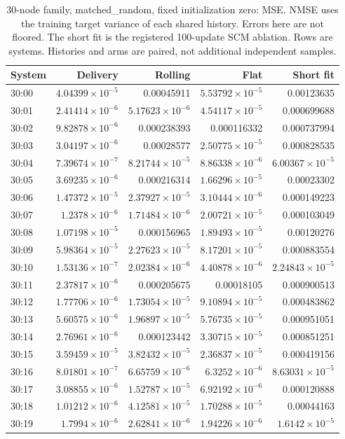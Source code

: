 \begin{table}[ht]
\centering\scriptsize
\begin{tabular}{lrrrr}
\toprule
System & Delivery & Rolling & Flat & Short fit\\
\midrule
30:00 & $4.04399\times10^{-5}$ & 0.00045911 & $5.53792\times10^{-5}$ & 0.00123635\\
30:01 & $2.41414\times10^{-6}$ & $5.17623\times10^{-6}$ & $4.54117\times10^{-5}$ & 0.000699688\\
30:02 & $9.82878\times10^{-6}$ & 0.000238393 & 0.000116332 & 0.000737994\\
30:03 & $3.04197\times10^{-6}$ & 0.00028577 & $2.50775\times10^{-5}$ & 0.000828535\\
30:04 & $7.39674\times10^{-7}$ & $8.21744\times10^{-5}$ & $8.86338\times10^{-6}$ & $6.00367\times10^{-5}$\\
30:05 & $3.69235\times10^{-6}$ & 0.000216314 & $1.66296\times10^{-5}$ & 0.00023302\\
30:06 & $1.47372\times10^{-5}$ & $2.37927\times10^{-5}$ & $3.10444\times10^{-6}$ & 0.000149223\\
30:07 & $1.2378\times10^{-6}$ & $1.71484\times10^{-6}$ & $2.00721\times10^{-5}$ & 0.000103049\\
30:08 & $1.07198\times10^{-5}$ & 0.000156965 & $1.89493\times10^{-5}$ & 0.00120276\\
30:09 & $5.98364\times10^{-5}$ & $2.27623\times10^{-5}$ & $8.17201\times10^{-5}$ & 0.000883554\\
30:10 & $1.53136\times10^{-7}$ & $2.02384\times10^{-6}$ & $4.40878\times10^{-6}$ & $2.24843\times10^{-5}$\\
30:11 & $2.37817\times10^{-6}$ & 0.000205675 & 0.00018105 & 0.000900513\\
30:12 & $1.77706\times10^{-6}$ & $1.73054\times10^{-5}$ & $9.10894\times10^{-5}$ & 0.000483862\\
30:13 & $5.60575\times10^{-6}$ & $1.96897\times10^{-5}$ & $5.76735\times10^{-5}$ & 0.000951051\\
30:14 & $2.76961\times10^{-6}$ & 0.000123442 & $3.30715\times10^{-5}$ & 0.000851251\\
30:15 & $3.59459\times10^{-5}$ & $3.82432\times10^{-5}$ & $2.36837\times10^{-5}$ & 0.000419156\\
30:16 & $8.01801\times10^{-7}$ & $6.65759\times10^{-6}$ & $6.3252\times10^{-6}$ & $8.63031\times10^{-5}$\\
30:17 & $3.08855\times10^{-6}$ & $1.52787\times10^{-5}$ & $6.92192\times10^{-6}$ & 0.000120888\\
30:18 & $1.01212\times10^{-6}$ & $4.12581\times10^{-5}$ & $1.70288\times10^{-5}$ & 0.00044163\\
30:19 & $1.7994\times10^{-6}$ & $2.62841\times10^{-6}$ & $1.94226\times10^{-6}$ & $1.6142\times10^{-5}$\\
\bottomrule
\end{tabular}
\caption{30-node family, matched\_random, fixed initialization zero: MSE. NMSE uses the training target variance of each shared history. Errors here are not floored. The short fit is the registered 100-update SCM ablation. Rows are systems. Histories and arms are paired, not additional independent samples.}
\end{table}
